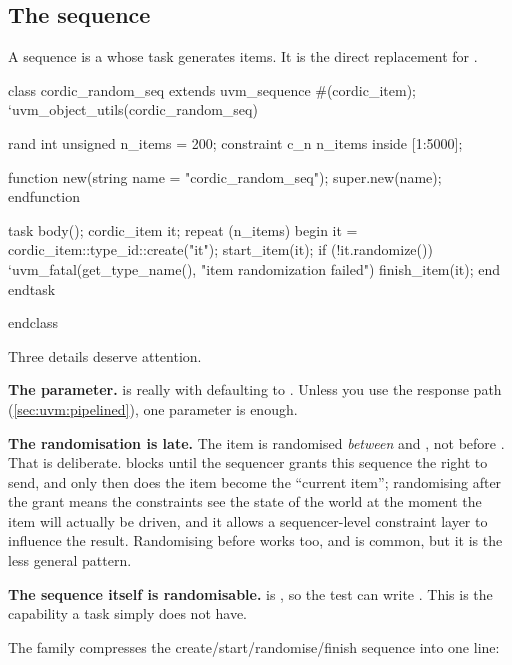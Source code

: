\subsection{The sequence}

A sequence is a  whose  task generates items.
It is the direct replacement for .

\begin{uvmcode}[caption={A random sequence},label={lst:uvm:seq-basic}]
class cordic_random_seq extends uvm_sequence #(cordic_item);
  `uvm_object_utils(cordic_random_seq)

  rand int unsigned n_items = 200;
  constraint c_n { n_items inside {[1:5000]}; }

  function new(string name = "cordic_random_seq");
    super.new(name);
  endfunction

  task body();
    cordic_item it;
    repeat (n_items) begin
      it = cordic_item::type_id::create("it");
      start_item(it);
      if (!it.randomize())
        `uvm_fatal(get_type_name(), "item randomization failed")
      finish_item(it);
    end
  endtask

endclass
\end{uvmcode}

Three details deserve attention.

\textbf{The parameter.}  is really
 with  defaulting to .
Unless you use the response path (\cref{sec:uvm:pipelined}), one parameter is
enough.

\textbf{The randomisation is late.} The item is randomised \emph{between}
 and , not before .
That is deliberate.  blocks until the sequencer grants this
sequence the right to send, and only then does the item become the ``current
item''; randomising after the grant means the constraints see the state of the
world at the moment the item will actually be driven, and it allows a
sequencer-level constraint layer to influence the result. Randomising before
 works too, and is common, but it is the less general
pattern.

\textbf{The sequence itself is randomisable.}  is ,
so the test can write
. This is the
capability a task simply does not have.

The  family compresses the create/start/randomise/finish
sequence into one line:

